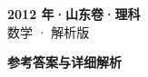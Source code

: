 \documentclass[zihao=-4, a4paper]{ctexart}
\begin{document}
\begin{center}
  {\Large\bfseries 2012 年·山东卷·理科}\\[4pt]
  {\large 数学 · 解析版}
\end{center}
\medskip
{}

\clearpage
{}
\begin{center}{\Large\bfseries 参考答案与详细解析}\end{center}
\medskip

\end{document}
